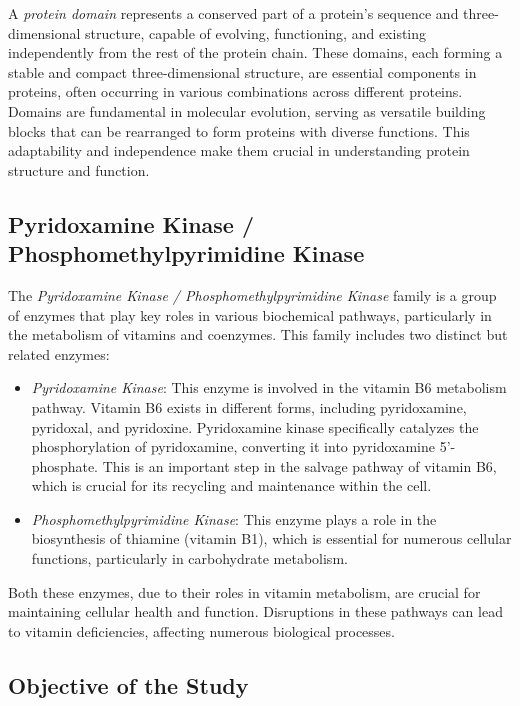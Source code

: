 \documentclass[10pt,twocolumn,letterpaper]{article}
\begin{document}
A \textit{protein domain} represents a conserved part of a protein's sequence and three-dimensional structure, capable of evolving, functioning, and existing independently from the rest of the protein chain. These domains, each forming a stable and compact three-dimensional structure, are essential components in proteins, often occurring in various combinations across different proteins. Domains are fundamental in molecular evolution, serving as versatile building blocks that can be rearranged to form proteins with diverse functions. This adaptability and independence make them crucial in understanding protein structure and function.

\subsection{Pyridoxamine Kinase / Phosphomethylpyrimidine Kinase}

The \textit{Pyridoxamine Kinase / Phosphomethylpyrimidine Kinase}\cite{family} family is a group of enzymes that play key roles in various biochemical pathways, particularly in the metabolism of vitamins and coenzymes. This family includes two distinct but related enzymes:

\begin{itemize}
\item \textit{Pyridoxamine Kinase}: This enzyme is involved in the vitamin B6 metabolism pathway. Vitamin B6 exists in different forms, including pyridoxamine, pyridoxal, and pyridoxine. Pyridoxamine kinase specifically catalyzes the phosphorylation of pyridoxamine, converting it into pyridoxamine 5'-phosphate. This is an important step in the salvage pathway of vitamin B6, which is crucial for its recycling and maintenance within the cell.

\item \textit{Phosphomethylpyrimidine Kinase}: This enzyme plays a role in the biosynthesis of thiamine (vitamin B1), which is essential for numerous cellular functions, particularly in carbohydrate metabolism.
\end{itemize}

Both these enzymes, due to their roles in vitamin metabolism, are crucial for maintaining cellular health and function. Disruptions in these pathways can lead to vitamin deficiencies, affecting numerous biological processes.

\subsection{Objective of the Study}
\end{document}

